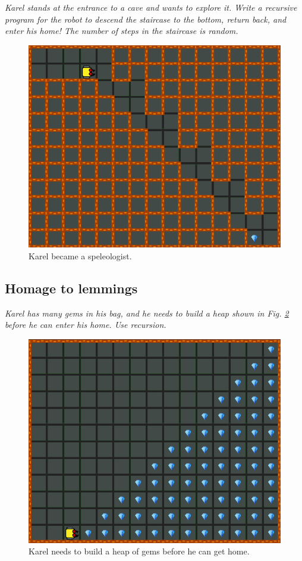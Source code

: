 {\em Karel stands at the entrance to a cave and wants to explore it. Write a recursive program for the robot to descend the staircase to the bottom, return back, and enter his home! The number of steps in the staircase is random.}
\begin{figure}[!ht]
\begin{center}
\includegraphics[height=0.4\textwidth]{img/g02.png}
\end{center}
\vspace{-4mm}
\caption{Karel became a speleologist.}
\label{fig:g02}
\end{figure}
\vspace{-1cm}



\subsection{Homage to lemmings}

{\em  Karel has many gems in his bag, and he needs to build a heap shown in Fig. \ref{fig:g03} before he can 
enter his home. Use recursion.}

\begin{figure}[!ht]
\begin{center}
\includegraphics[height=0.4\textwidth]{img/g03.png}
\end{center}
\vspace{-4mm}
\caption{Karel needs to build a heap of gems before he can get home.}
\label{fig:g03}
\vspace{-1cm}
\end{figure}
\newpage


